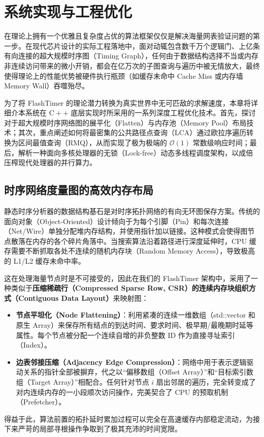 \chapter{系统实现与工程优化}
\label{chap:system_implementation}

在理论上拥有一个优雅且复杂度占优的算法框架仅仅是解决海量网表验证问题的第一步。在现代芯片设计的实际工程落地中，面对动辄包含数千万个逻辑门、上亿条有向连接的超大规模时序图（Timing Graph），任何由于数据结构选择不当或内存非连续访问带来的微小开销，都会在亿万次的子图查询与遍历中被无情放大，最终使得理论上的性能优势被硬件执行瓶颈（如缓存未命中 Cache Miss 或内存墙 Memory Wall）吞噬殆尽。

为了将 FlashTimer 的理论潜力转换为真实世界中无可匹敌的求解速度，本章将详细介本系统在 $\text{C}++$ 底层实现时所采用的一系列深度工程优化技术。首先，探讨对于超大规模时序网络图的展平化（Flatten）与内存池（Memory Pool）布局技术；其次，重点阐述如何将最密集的公共路径点查询（LCA）通过欧拉序遍历转换为区间最值查询（RMQ），从而实现了极为极端的 $\mathcal{O}(1)$ 常数级响应时间；最后，解析一种面向多核处理器的无锁（Lock-free）动态多线程调度架构，以成倍压榨现代处理器的并行算力。

\section{时序网络度量图的高效内存布局}
\label{sec:memory_layout}

静态时序分析器的数据结构基石是对时序拓扑网络的有向无环图保存方案。传统的面向对象（Object-Oriented）设计倾向于为每个引脚（Pin）和每次连接（Net/Wire）单独分配堆内存结构，并使用指针加以链接。这种模式会使得图节点散落在内存的各个碎片角落中。当搜索算法沿着路径进行深度延伸时，CPU 缓存需要不断抓取各处不连续的随机内存块（Random Memory Access），导致极高的 L1/L2 缓存未命中率。

这在处理海量节点时是不可接受的，因此在我们的 FlashTimer 架构中，采用了一种类似于\textbf{压缩稀疏行（Compressed Sparse Row, CSR）的连续内存块组织方式（Contiguous Data Layout）}来映射图：
\begin{itemize}
    \item \textbf{节点平坦化（Node Flattening）}：利用紧凑的连续一维数组（std::vector 和原生 Array）来保存所有结点的到达时间、要求时间、极早期/最晚期时延等属性。每个节点被分配一个连续自增的非负整数 ID 作为直接寻址索引（Index）。
    \item \textbf{边表邻接压缩（Adjacency Edge Compression）}：网络中用于表示逻辑驱动关系的指针全部被摒弃，代之以“偏移数组（Offset Array）”和“目标索引数组（Target Array）”相配合。任何针对节点 $i$ 扇出邻居的遍历，完全转变成了对内连续内存的一小段顺次访问操作，完美契合了 CPU 的预取机制（Prefetcher）。
\end{itemize}
得益于此，算法前置的拓扑延时累加过程可以完全在高速缓存内部稳定流动，为接下来严苛的局部寻根操作争取到了极其充沛的时间宽限。

